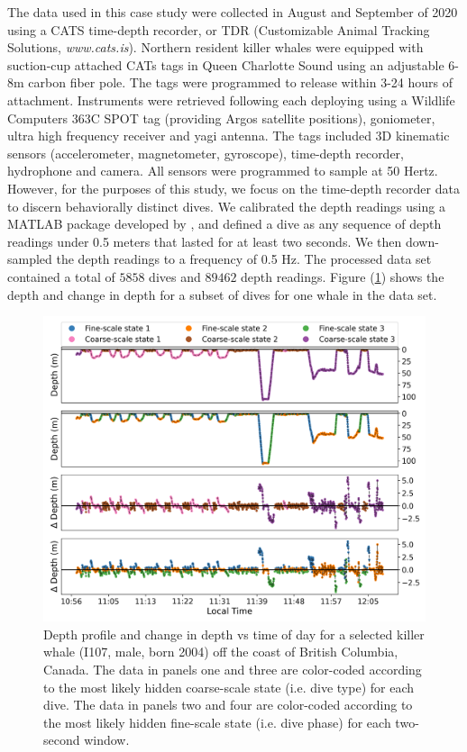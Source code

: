 The data used in this case study were collected in August and September of 2020 using a CATS time-depth recorder, or TDR (Customizable Animal Tracking Solutions, {\em{www.cats.is}}). Northern resident killer whales were equipped with suction-cup attached CATs tags in Queen Charlotte Sound using an adjustable 6-8m carbon fiber pole. The tags were programmed to release within 3-24 hours of attachment. Instruments were retrieved following each deploying using a Wildlife Computers 363C SPOT tag (providing Argos satellite positions), goniometer, ultra high frequency receiver and yagi antenna. The tags included 3D kinematic sensors (accelerometer, magnetometer, gyroscope), time-depth recorder, hydrophone and camera. All sensors were programmed to sample at 50 Hertz. However, for the purposes of this study, we focus on the time-depth recorder data to discern behaviorally distinct dives. We calibrated the depth readings using a MATLAB package developed by \citet{Cade:2021}, and defined a dive as any sequence of depth readings under 0.5 meters that lasted for at least two seconds. We then down-sampled the depth readings to a frequency of 0.5 Hz. The processed data set contained a total of $5858$ dives and $89462$ depth readings. Figure (\ref{fig:data}) shows the depth and change in depth for a subset of dives for one whale in the data set. 
%
\begin{figure}
    \centering
    \includegraphics[width=5in]{plt/decoded_dives_kw_I107_K_3_3_nWhales_8.png}
    \caption{Depth profile and change in depth vs time of day for a selected killer whale (I107, male, born 2004) off the coast of British Columbia, Canada. The data in panels one and three are color-coded according to the most likely hidden coarse-scale state (i.e. dive type) for each dive. The data in panels two and four are color-coded according to the most likely hidden fine-scale state (i.e. dive phase) for each two-second window.}
    \label{fig:data}
\end{figure}
%
